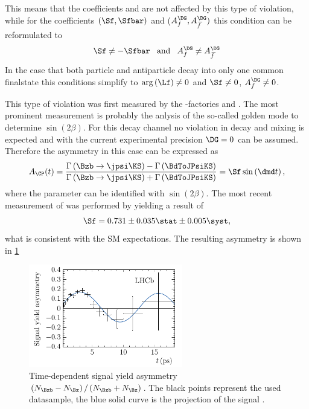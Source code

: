 This means that the \CP coefficients \Cf and \Cfbar are not affected by this type of \CP violation, while for the coefficients $(\Sf, \Sfbar)$ and  ($A_f^{\DG}, A_{\kern 1.5pt\overline{\kern -1.5pt f\kern 1.5pt}}^{\DG})$ this condition can be reformulated to
\begin{equation}
\Sf\neq-\Sfbar\,\,\,\,\,\text{and}\,\,\,\,\,A_f^{\DG}\neq A_{\kern 1.5pt\overline{\kern -1.5pt f\kern 1.5pt}}^{\DG}
\end{equation}
In the case that both particle and antiparticle decay into only one common finalstate this conditions simplify to $\arg\left(\Lf\right)\neq0$ and $\Sf\neq0$, $A_f^{\DG}\neq0$.

This type of \CP violation was first measured by the \B-factories \babar \cite{Aubert:2001nu} and \belle \cite{Abe:2001xe}.
The most prominent measurement is probably the anlysis of the so-called golden mode \BdToJPsiKS to determine $\sin\!\left(2\beta\right)$.
For this decay channel no \CP violation in decay and mixing is expected and with the current experimental precision $\DG=0$ can be assumed.
Therefore the \CP asymmetry in this case can be expressed as
\begin{equation}
A_{\CP}(t)=\frac{\Gamma\left(\Bzb\to\jpsi\KS\right)-\Gamma\left(\BdToJPsiKS\right)}{\Gamma\left(\Bzb\to\jpsi\KS\right)+\Gamma\left(\BdToJPsiKS\right)}=\Sf\sin\left(\dmd t\right),
\end{equation}
where the parameter \Sf can be identified with $\sin{}\left(2\beta\right)$.
The most recent measurement of \Sf was performed by \lhcb \cite{Aaij:2015vza} yielding a result of
\begin{equation}
\Sf=0.731\pm0.035\stat\pm0.005\syst,
\end{equation}
what is consistent with the \ac{SM} expectations. The resulting \CP asymmetry is shown in \cref{fig:sin2beta}
\begin{figure}[tbp]
	\centering
	\includegraphics[width=0.6\textwidth]{03CPV/figs/InterferenceCPV.pdf}
	\caption{Time-dependent signal yield asymmetry $\left(N_{\Bzb}-N_{\Bz}\right)/\left(N_{\Bzb}+N_{\Bz}\right)$. The black points represent the used datasample, the blue solid curve is the projection of the signal \PDF.}
	\label{fig:sin2beta}
\end{figure}

